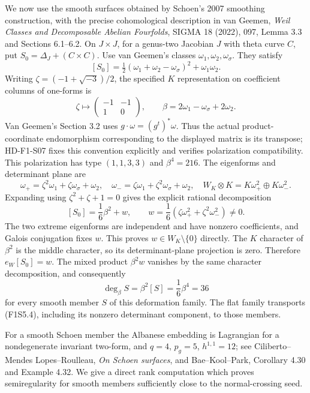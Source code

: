 We now use the smooth surfaces obtained by Schoen's 2007 smoothing
construction, with the precise cohomological description in
van Geemen, \emph{Weil Classes and Decomposable Abelian Fourfolds},
SIGMA 18 (2022), 097, Lemma 3.3 and Sections 6.1--6.2.
On $J\times J$, for a genus-two Jacobian $J$ with theta curve $C$,
put $S_0=\Delta_J+(C\times C)$. Use van Geemen's classes
$\omega_1,\omega_2,\omega_\sigma$. They satisfy
\[
 [S_0]=\tfrac12(\omega_1+\omega_2-\omega_\sigma)^2
                       +\omega_1\omega_2.
 \tag{F1S5.1}
\]
Writing $\zeta=(-1+\sqrt{-3})/2$, the specified $K$ representation
on coefficient columns of one-forms is
\[
 \zeta\longmapsto\begin{pmatrix}-1&-1\\1&0\end{pmatrix},\qquad
 \beta=2\omega_1-\omega_\sigma+2\omega_2.
 \tag{F1S5.2}
\]
Van Geemen's Section 3.2 uses $g\cdot\omega=(g^t)^*\omega$.
Thus the actual product-coordinate endomorphism corresponding
to the displayed matrix is its transpose; HD-F1-S07 fixes this
convention explicitly and verifies polarization compatibility.
This polarization has type $(1,1,3,3)$ and $\beta^4=216$.
The eigenforms and determinant plane are
\[
 \omega_+=\zeta^2\omega_1+\zeta\omega_\sigma+\omega_2,
 \quad \omega_-=\zeta\omega_1+\zeta^2\omega_\sigma+\omega_2,
 \quad W_K\otimes K=K\omega_+^2\oplus K\omega_-^2.
 \tag{F1S5.3}
\]
Expanding using $\zeta^2+\zeta+1=0$ gives the explicit rational
decomposition
\[
 [S_0]=\frac16\beta^2+w,\qquad
 w=\frac16(\zeta\omega_+^2+\zeta^2\omega_-^2)\ne0.
 \tag{F1S5.4}
\]
The two extreme eigenforms are independent and have nonzero
coefficients, and Galois conjugation fixes $w$. This proves
$w\in W_K\setminus\{0\}$ directly. The $K$ character of
$\beta^2$ is the middle character, so its determinant-plane
projection is zero. Therefore $e_W[S_0]=w$.
The mixed product $\beta^2w$ vanishes by the same character
decomposition, and consequently
\[
 \deg_\beta S=\beta^2[S]=\frac16\beta^4=36
 \tag{F1S5.5}
\]
for every smooth member $S$ of this deformation family.
The flat family transports (F1S5.4), including its nonzero
determinant component, to those members.

For a smooth Schoen member the Albanese embedding is Lagrangian
for a nondegenerate invariant two-form, and
$q=4$, $p_g=5$, $h^{1,1}=12$; see Ciliberto--Mendes Lopes--Roulleau,
\emph{On Schoen surfaces}, and Bae--Kool--Park, Corollary 4.30
and Example 4.32. We give a direct rank computation which
proves semiregularity for smooth members sufficiently close
to the normal-crossing seed.

